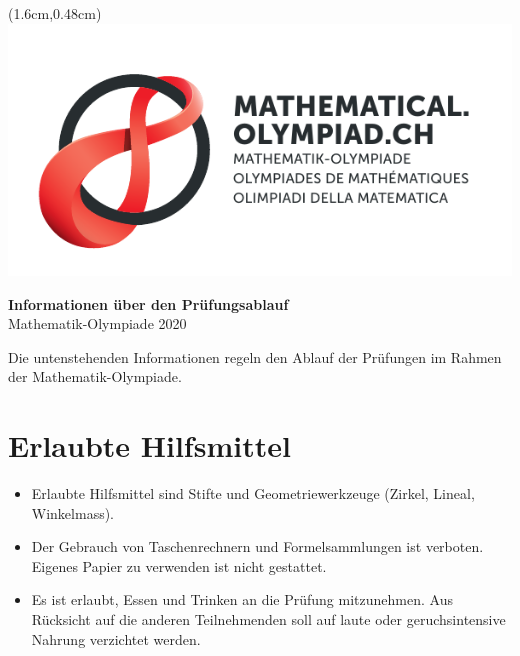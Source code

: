 \documentclass[12pt,a4paper]{article}
\begin{document}
\thispagestyle{empty}

\begin{textblock*}{\paperwidth}(1.6cm,0.48cm) %
\includegraphics[scale=0.67]{Logo_Mathematik_CMYK.pdf}
\end{textblock*}

\vspace*{1.5cm}

\begin{center}
\Huge{\textbf{Informationen über den Prüfungsablauf}}\\
\large{Mathematik-Olympiade 2020}
\end{center}

\bigskip

Die untenstehenden Informationen regeln den Ablauf der Prüfungen im Rahmen der Mathematik-Olympiade.

\section{Erlaubte Hilfsmittel}
\begin{itemize}
\item Erlaubte Hilfsmittel sind Stifte und Geometriewerkzeuge (Zirkel, Lineal, Winkelmass). 
\item Der Gebrauch von Taschenrechnern und Formelsammlungen ist verboten. Eigenes Papier zu verwenden ist nicht gestattet.
\item Es ist erlaubt, Essen und Trinken an die Prüfung mitzunehmen. Aus Rücksicht auf die anderen Teilnehmenden soll auf laute oder geruchsintensive Nahrung verzichtet werden.
\end{itemize}
\end{document}
